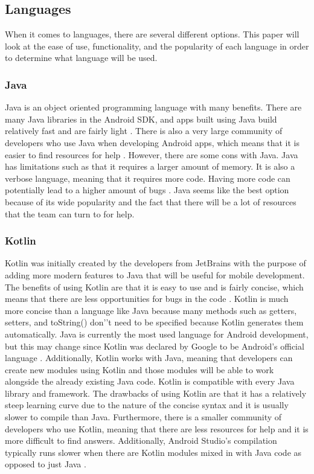 \documentclass[onecolumn, draftclsnofoot,10pt, compsoc]{IEEEtran}
\begin{document}
\subsection{Languages}
When it comes to languages, there are several different options. This paper will look at the ease of use, functionality, and the popularity of each language in order to determine what language will be used.

\subsubsection{Java}
Java is an object oriented programming language with many benefits. There are many Java libraries in the Android SDK, and apps built using Java build relatively fast and are fairly light \cite{W-JK}. There is also a very large community of developers who use Java when developing Android apps, which means that it is easier to find resources for help \cite{W-JK2}. However, there are some cons with Java. Java has limitations such as that it requires a larger amount of memory. It is also a verbose language, meaning that it requires more code. Having more code can potentially lead to a higher amount of bugs \cite{W-JK}. Java seems like the best option because of its wide popularity and the fact that there will be a lot of resources that the team can turn to for help.

\subsubsection{Kotlin}
Kotlin was initially created by the developers from JetBrains with the purpose of adding more modern features to Java that will be useful for mobile development. The benefits of using Kotlin are that it is easy to use and is fairly concise, which means that there are less opportunities for bugs in the code \cite{W-JK}. Kotlin is much more concise than a language like Java because many methods such as getters, setters, and toString() don’'t need to be specified because Kotlin generates them automatically. Java is currently the most used language for Android development, but this may change since Kotlin was declared by Google to be Android's official language \cite{W-JK2}.  Additionally, Kotlin works with Java, meaning that developers can create new modules using Kotlin and those modules will be able to work alongside the already existing Java code. Kotlin is compatible with every Java library and framework. The drawbacks of using Kotlin are that it has a relatively steep learning curve due to the nature of the concise syntax and it is usually slower to compile than Java. Furthermore, there is a smaller community of developers who use Kotlin, meaning that there are less resources for help and it is more difficult to find answers. Additionally, Android Studio’s compilation typically runs slower when there are Kotlin modules mixed in with Java code as opposed to just Java \cite{W-JK}. 
\end{document}
